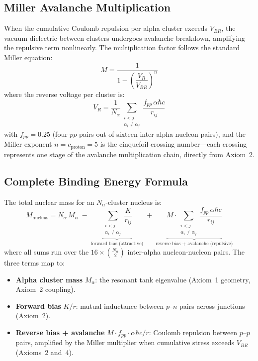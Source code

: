 \subsection{Miller Avalanche Multiplication}

When the cumulative Coulomb repulsion per alpha cluster exceeds $V_{BR}$, the vacuum dielectric between clusters undergoes avalanche breakdown, amplifying the repulsive term nonlinearly. The multiplication factor follows the standard Miller equation:
\begin{equation}
    M = \frac{1}{1 - \left(\dfrac{V_R}{V_{BR}}\right)^{n}}
    \label{eq:miller}
\end{equation}
where the reverse voltage per cluster is:
\begin{equation}
    V_R = \frac{1}{N_\alpha} \sum_{\substack{i<j \\ \alpha_i \neq \alpha_j}} \frac{f_{pp} \, \alpha\hbar c}{r_{ij}}
    \label{eq:V_R}
\end{equation}
with $f_{pp} = 0.25$ (four $pp$ pairs out of sixteen inter-alpha nucleon pairs), and the Miller exponent $n = c_\text{proton} = 5$ is the cinquefoil crossing number---each crossing represents one stage of the avalanche multiplication chain, directly from Axiom~2.

\subsection{Complete Binding Energy Formula}

The total nuclear mass for an $N_\alpha$-cluster nucleus is:
\begin{equation}
    \boxed{
    M_\text{nucleus} = N_\alpha \, M_\alpha \;-\; \underbrace{\sum_{\substack{i<j \\ \alpha_i \neq \alpha_j}} \frac{K}{r_{ij}}}_{\text{forward bias (attractive)}} \;+\; \underbrace{M \cdot \sum_{\substack{i<j \\ \alpha_i \neq \alpha_j}} \frac{f_{pp}\,\alpha\hbar c}{r_{ij}}}_{\text{reverse bias + avalanche (repulsive)}}
    }
    \label{eq:semiconductor_mass}
\end{equation}
where all sums run over the $16 \times \binom{N_\alpha}{2}$ inter-alpha nucleon-nucleon pairs. The three terms map to:
\begin{itemize}
    \item \textbf{Alpha cluster mass} $M_\alpha$: the resonant tank eigenvalue (Axiom~1 geometry, Axiom~2 coupling).
    \item \textbf{Forward bias} $K/r$: mutual inductance between $p$--$n$ pairs across junctions (Axiom~2).
    \item \textbf{Reverse bias + avalanche} $M \cdot f_{pp} \cdot \alpha\hbar c / r$: Coulomb repulsion between $p$--$p$ pairs, amplified by the Miller multiplier when cumulative stress exceeds $V_{BR}$ (Axioms~2 and~4).
\end{itemize}

